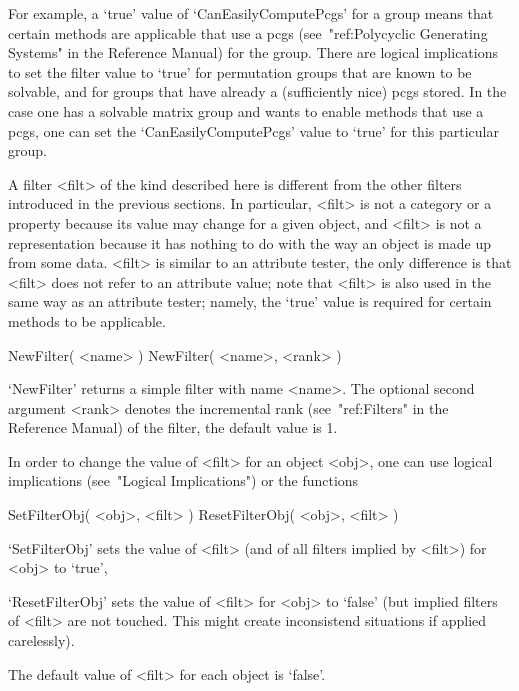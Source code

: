 For example, a `true' value of `CanEasilyComputePcgs' for a group
means that certain methods are applicable that use a pcgs
(see~"ref:Polycyclic Generating Systems" in the Reference Manual)
for the group.
There are logical implications to set the filter value to `true'
for permutation groups that are known to be solvable,
and for groups that have already a (sufficiently nice) pcgs stored.
In the case one has a solvable matrix group and wants to enable methods
that use a pcgs, one can set the `CanEasilyComputePcgs' value to
`true' for this particular group.

A filter <filt> of the kind described here is different from
the other filters introduced in the previous sections.
In particular, <filt> is not a category or a property
because its value may change for a given object,
and <filt> is not a representation because it has nothing to do
with the way an object is made up from some data.
<filt> is similar to an attribute tester, the only difference is
that <filt> does not refer to an attribute value;
note that <filt> is also used in the same way as an attribute tester;
namely, the `true' value is required for certain methods to be
applicable.

\>NewFilter( <name> )
\)NewFilter( <name>, <rank> )

`NewFilter' returns a simple filter with name <name>.
The optional second argument <rank> denotes the incremental rank
(see~"ref:Filters" in the Reference Manual) of the filter,
the default value is 1.

In order to change the value of <filt> for an object <obj>,
one can use logical implications (see~"Logical Implications") or
the functions

\>SetFilterObj( <obj>, <filt> )
\>ResetFilterObj( <obj>, <filt> )

`SetFilterObj' sets the value of <filt> (and of all filters implied by
<filt>) for <obj> to `true',

`ResetFilterObj' sets the value of <filt> for <obj> to `false' (but implied
filters of <filt> are not touched. This might create inconsistend situations
if applied carelessly).

The default value of <filt> for each object is `false'.




